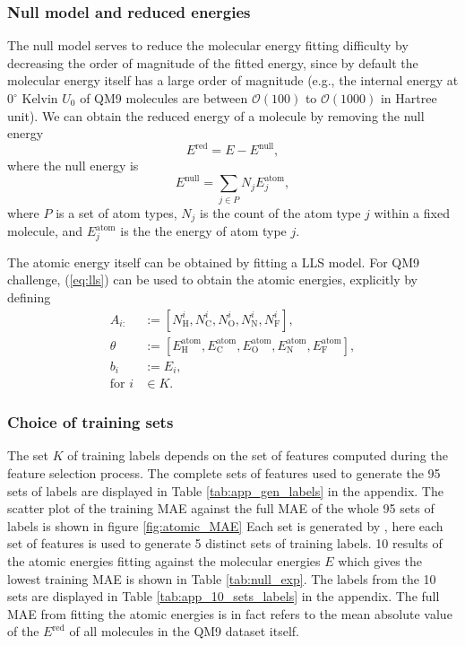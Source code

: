 \documentclass[12pt]{article}
\begin{document}
\subsubsection{Null model and reduced energies}
\label{subsubsec:ered}
The null model serves to reduce the molecular energy fitting difficulty by decreasing the order of magnitude of the fitted energy, since by default the molecular energy itself has a large order of magnitude (e.g., the internal energy at $0^{\circ}$ Kelvin $U_0$ of QM9 molecules are between $\mathcal{O}(100)$ to $\mathcal{O}(1000)$ in Hartree unit). We can obtain the reduced energy of a molecule by removing the null energy
\begin{equation}
	\label{eq:ered}
	E^\text{red} = E - E^\text{null},
\end{equation}
where the null energy is
\begin{equation}
	E^\text{null} = \sum_{j \in P} N_j E^\text{atom}_j,
	\label{eq:nullmodel}
\end{equation}
where $P$ is a set of atom types, $N_j$ is the count of the atom type $j$ within a fixed molecule, and $E^\text{atom}_j$ is the the energy of atom type $j$.

The atomic energy itself can be obtained by fitting a LLS model. For QM9 challenge, (\ref{eq:lls}) can be used to obtain the atomic energies, explicitly by defining
\begin{equation}
	\label{eq:enull2}
	\begin{split}
		A_{i:} &:= [N^i_\text{H}, N^i_\text{C}, N^i_\text{O}, N^i_\text{N}, N^i_\text{F}], \\
		\theta &:= [E^\text{atom}_\text{H}, E^\text{atom}_\text{C}, E^\text{atom}_\text{O}, E^\text{atom}_\text{N}, E^\text{atom}_\text{F}], \\
		b_i &:= E_i, \\
		\text{for }i &\in K.
	\end{split}
\end{equation}
\subsubsection{Choice of training sets}
The set $K$ of training labels depends on the set of features computed during the feature selection process. 
The complete sets of features used to generate the 95 sets of labels are displayed in Table \ref{tab:app_gen_labels} in the appendix. 
The scatter plot of the training MAE against the full MAE of the whole 95 sets of labels is shown in figure \ref{fig:atomic_MAE}
Each set is generated by , here each set of features is used to generate 5 distinct sets of training labels. 10 results of the atomic energies fitting against the molecular energies $E$ which gives the lowest training MAE is shown in Table \ref{tab:null_exp}. 
The labels from the 10 sets are displayed in Table \ref{tab:app_10_sets_labels} in the appendix.
The full MAE from fitting the atomic energies is in fact refers to the mean absolute value of the $E^\text{red}$ of all molecules in the QM9 dataset itself.
\end{document}
